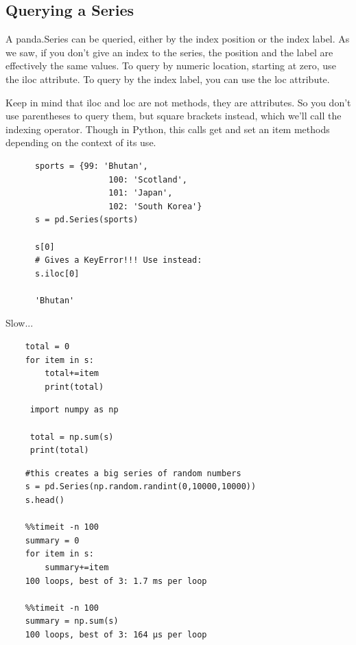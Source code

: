 \documentclass[11pt]{article}
\begin{document}
    \subsection{Querying a Series}
    \smallskip \smallskip \noindent
    A panda.Series can be queried, either by the index position or the
    index label. As we saw, if you don't give an index to the series, the
    position and the label are effectively the same values. To query by
    numeric location, starting at zero, use the iloc attribute. To query
    by the index label, you can use the loc attribute.

    \smallskip \smallskip \noindent
    Keep in mind that iloc and loc are not methods, they are
    attributes. So you don't use parentheses to query them, but square
    brackets instead, which we'll call the indexing operator. Though in
    Python, this calls get and set an item methods depending on the
    context of its use.

    \begin{lstlisting}
      sports = {99: 'Bhutan',
                     100: 'Scotland',
                     101: 'Japan',
                     102: 'South Korea'}
      s = pd.Series(sports)

      s[0] 
      # Gives a KeyError!!! Use instead:
      s.iloc[0]
        
      'Bhutan'
    \end{lstlisting}
    
    Slow...
    \begin{lstlisting}
    total = 0
    for item in s:
        total+=item
        print(total)
    \end{lstlisting}

    \begin{lstlisting}
     import numpy as np
     
     total = np.sum(s)
     print(total)
    \end{lstlisting}

    \begin{lstlisting}
    #this creates a big series of random numbers
    s = pd.Series(np.random.randint(0,10000,10000))
    s.head()
    
    %%timeit -n 100
    summary = 0
    for item in s:
        summary+=item
    100 loops, best of 3: 1.7 ms per loop
       
    %%timeit -n 100
    summary = np.sum(s)    
    100 loops, best of 3: 164 µs per loop
    \end{lstlisting}
\end{document}
